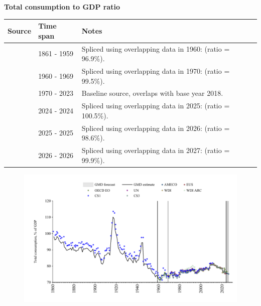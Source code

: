 \documentclass[12pt,a4paper,landscape]{article}
\begin{document}
\begin{adjustbox}{max totalsize={\paperwidth}{\paperheight},center}
\begin{minipage}[t][\textheight][t]{\textwidth}
\vspace*{0.5cm}
{}
\begin{center}
{\Large\bfseries Total consumption to GDP ratio}
\end{center}
\vspace{0.5cm}
\begin{table}[H]
\centering
\small
\begin{tabular}{|l|l|l|}
\hline
\textbf{Source} & \textbf{Time span} & \textbf{Notes} \\
\hline
\rowcolor{white}\cite{CS1_ITA}& 1861 - 1959 &Spliced using overlapping data in 1960: (ratio = 96.9\%). \\
\rowcolor{lightgray}\cite{OECD_EO}& 1960 - 1969 &Spliced using overlapping data in 1970: (ratio = 99.5\%). \\
\rowcolor{white}\cite{WDI}& 1970 - 2023 &Baseline source, overlaps with base year 2018. \\
\rowcolor{lightgray}\cite{EUS}& 2024 - 2024 &Spliced using overlapping data in 2025: (ratio = 100.5\%). \\
\rowcolor{white}\cite{OECD_EO}& 2025 - 2025 &Spliced using overlapping data in 2026: (ratio = 98.6\%). \\
\rowcolor{lightgray}\cite{AMECO}& 2026 - 2026 &Spliced using overlapping data in 2027: (ratio = 99.9\%). \\
\hline
\end{tabular}
\end{table}
\begin{figure}[H]
\centering
\includegraphics[width=\textwidth,height=0.6\textheight,keepaspectratio]{graphs/ITA_cons_GDP.pdf}
\end{figure}
\end{minipage}
\end{adjustbox}
\end{document}
